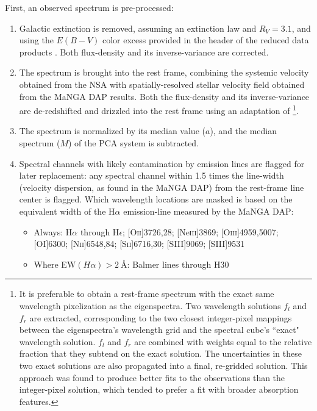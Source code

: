 First, an observed spectrum is pre-processed:
\begin{enumerate}
\itemsep0em
    \item Galactic extinction is removed, assuming an \citet{odonnell_94_mw_extinction} extinction law and $R_V = 3.1$, and using the $E(B-V)$ color excess provided in the header of the reduced data products \citep{schlegel_finkbeiner_davis}. Both flux-density and its inverse-variance are corrected.
    \item The spectrum is brought into the rest frame, combining the systemic velocity obtained from the NSA with spatially-resolved stellar velocity field obtained from the MaNGA DAP results. Both the flux-density and its inverse-variance are de-redshifted and drizzled into the rest frame using an adaptation of \citet{carnall_17}\footnote{It is preferable to obtain a rest-frame spectrum with the exact same wavelength pixelization as the eigenspectra. Two wavelength solutions $f_l$ and $f_r$ are extracted, corresponding to the two closest integer-pixel mappings between the eigenspectra's wavelength grid and the spectral cube's ``exact" wavelength solution. $f_l$ and $f_r$ are combined with weights equal to the relative fraction that they subtend on the exact solution. The uncertainties in these two exact solutions are also propagated into a final, re-gridded solution. This approach was found to produce better fits to the observations than the integer-pixel solution, which tended to prefer a fit with broader absorption features.}.
    \item The spectrum is normalized by its median value ($a$), and the median spectrum ($M$) of the PCA system is subtracted.
    \item Spectral channels with likely contamination by emission lines are flagged for later replacement: any spectral channel within 1.5 times the line-width (velocity dispersion, as found in the MaNGA DAP) from the rest-frame line center is flagged. Which wavelength locations are masked is based on the equivalent width of the H$\alpha$ emission-line measured by the MaNGA DAP:
    \begin{itemize}
    \itemsep0em
        \item Always: H$\alpha$ through H$\epsilon$; [O\textsc{ii}]3726,28; [Ne\textsc{iii}]3869; [O\textsc{iii}]4959,5007; [O\textsc{I}]6300; [N\textsc{ii}]6548,84; [S\textsc{ii}]6716,30; [S\textsc{III}]9069; [S\textsc{III}]9531
        \item Where EW$(H\alpha) > 2~\mbox{\AA}$: Balmer lines through H$30$

\end{itemize}
\end{enumerate}
